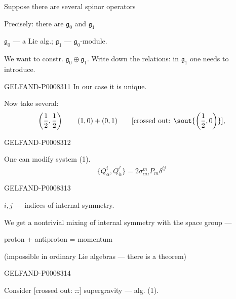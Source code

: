 Suppose there are several spinor operators

Precisely: there are \(\mathfrak g_0\) and \(\mathfrak g_1\)

\(\mathfrak g_0\) — a Lie alg.; \(\mathfrak g_1\) — \(\mathfrak g_0\)-module.

We want to constr. \(\mathfrak g_0\oplus\mathfrak g_1\).
Write down the relations: in \(\mathfrak g_1\) one needs to introduce.


\begin{GelfandAdjacentEvidence}{GELFAND-P000831}{1}
In our case it is unique.

Now take several:
\[
\left(\frac12,\frac12\right)\qquad (1,0)+(0,1)\qquad
\text{[crossed out: \sout{\(\left(\frac12,0\right)\)}]},
\]
\end{GelfandAdjacentEvidence}
\begin{GelfandAdjacentEvidence}{GELFAND-P000831}{2}


One can modify system (1).
\begin{equation*}
\{Q_\alpha^i,\bar Q_{\dot\alpha}^j\}
=2\sigma^m_{\alpha\dot\alpha}P_m\delta^{ij}
\tag{2}
\end{equation*}
\end{GelfandAdjacentEvidence}
\begin{GelfandAdjacentEvidence}{GELFAND-P000831}{3}

\(i,j\) — indices of internal symmetry.

We get a nontrivial mixing of internal symmetry with the space group —

proton + antiproton = momentum

(impossible in ordinary Lie algebras — there is a theorem)

\end{GelfandAdjacentEvidence}
\begin{GelfandAdjacentEvidence}{GELFAND-P000831}{4}


Consider [crossed out: \sout{…}] supergravity — alg. (1).
\end{GelfandAdjacentEvidence}
